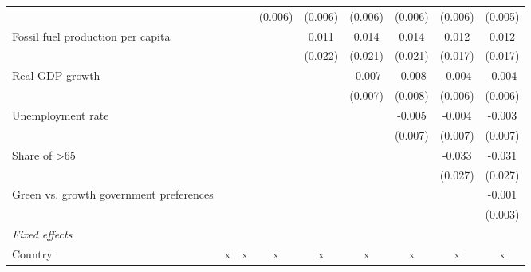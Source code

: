 \begin{table}[htbp]
\begin{tabular}{lcccccccc}
                                                &               &              & (0.006)       & (0.006)      & (0.006)       & (0.006)       & (0.006)       & (0.005)\\   
      Fossil fuel production per capita         &               &              &               & 0.011        & 0.014         & 0.014         & 0.012         & 0.012\\   
                                                &               &              &               & (0.022)      & (0.021)       & (0.021)       & (0.017)       & (0.017)\\   
      Real GDP growth                           &               &              &               &              & -0.007        & -0.008        & -0.004        & -0.004\\   
                                                &               &              &               &              & (0.007)       & (0.008)       & (0.006)       & (0.006)\\   
      Unemployment rate                         &               &              &               &              &               & -0.005        & -0.004        & -0.003\\   
                                                &               &              &               &              &               & (0.007)       & (0.007)       & (0.007)\\   
      Share of >65                              &               &              &               &              &               &               & -0.033        & -0.031\\   
                                                &               &              &               &              &               &               & (0.027)       & (0.027)\\   
      Green vs. growth government preferences   &               &              &               &              &               &               &               & -0.001\\   
                                                &               &              &               &              &               &               &               & (0.003)\\   
      \emph{Fixed effects}\\
      Country                                   & x             & x            & x             & x            & x             & x             & x             & x\\  

\end{tabular}
\end{table}
